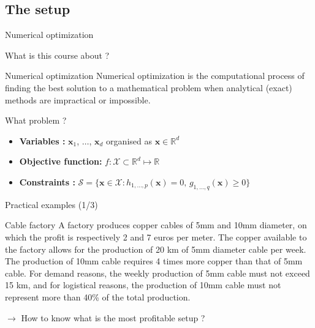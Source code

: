 \documentclass[aspectratio=1610]{beamer}
\begin{document}
\subsection{The setup}
\begin{frame}{Numerical optimization}

  What is this course about ?

  \pause

  \begin{block}{Numerical optimization}
    Numerical optimization is the computational process of finding the best solution to a mathematical problem when analytical (exact) methods are impractical or impossible.
  \end{block}


  What problem ? 
  \pause

  \begin{itemize}
    \item \textbf{Variables : } $\mathbf{x}_1$, $\dots$, $\mathbf{x}_d$ organised as $\mathbf{x}\in\mathbb{R}^d$
    \item \textbf{Objective function:} $f:\mathcal{X}\subset\mathbb{R}^d \mapsto \mathbb{R}$
    \item \textbf{Constraints :} $\mathcal{S} = \{\mathbf{x}\in\mathcal{X} : h_{1,\dots,p}(\mathbf{x})=0,\, g_{1,\dots,q}(\mathbf{x})\geq 0\}$
  \end{itemize}


\end{frame}

\begin{frame}{Practical examples (1/3)}

  \begin{block}{Cable factory}
    \small
    A factory produces copper cables of 5mm and 10mm diameter, on which the profit is respectively 2 and 7 euros per meter. The copper available to the factory allows for the production of 20 km of 5mm diameter cable per week. The production of 10mm cable requires 4 times more copper than that of 5mm cable. For demand reasons, the weekly production of 5mm cable must not exceed 15 km, and for logistical reasons, the production of 10mm cable must not represent more than 40\% of the total production.
  \end{block}
  \pause

  $\rightarrow$ How to know what is the most profitable setup ?

\end{frame}
\end{document}
